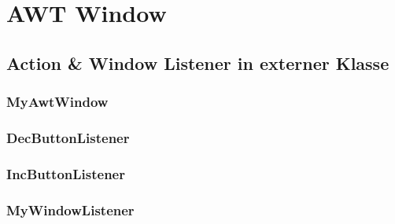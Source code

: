 \newpage
\section{AWT Window}

\newpage
\subsection{Action \& Window Listener in externer Klasse}
\subsubsection{MyAwtWindow}

\newpage
\subsubsection{DecButtonListener}

\subsubsection{IncButtonListener}	

\subsubsection{MyWindowListener}	






